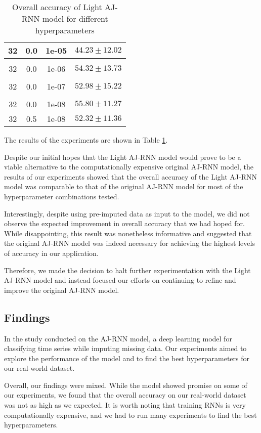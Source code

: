 \begin{table}[!htbp]
\begin{tabular}{cccr}
      32  & 0.0 & 1e-05 & $44.23 \pm 12.02$\\[0.05cm] \hline \\[-0.25cm]
      32  & 0.0 & 1e-06 & $54.32 \pm 13.73$\\[0.05cm] \hline \\[-0.25cm]
      32  & 0.0 & 1e-07 & $52.98 \pm 15.22$\\[0.05cm] \hline \\[-0.25cm]
      32  & 0.0 & 1e-08 & $55.80 \pm 11.27$\\
      32  & 0.5 & 1e-08 & $52.32 \pm 11.36$\\
  \end{tabular}
  \caption{Overall accuracy of Light AJ-RNN model for different hyperparameters}
  \label{tab:LightAJRNNBatchSizeResults}
\end{table}

The results of the experiments are shown in Table \ref{tab:LightAJRNNBatchSizeResults}.

Despite our initial hopes that the Light AJ-RNN model would prove to be a viable alternative to the computationally expensive original AJ-RNN model, the results of our experiments showed that the overall accuracy of the Light AJ-RNN model was comparable to that of the original AJ-RNN model for most of the hyperparameter combinations tested.

Interestingly, despite using pre-imputed data as input to the model, we did not observe the expected improvement in overall accuracy that we had hoped for. 
While disappointing, this result was nonetheless informative and suggested that the original AJ-RNN model was indeed necessary for achieving the highest levels of accuracy in our application.

Therefore, we made the decision to halt further experimentation with the Light AJ-RNN model and instead focused our efforts on continuing to refine and improve the original AJ-RNN model. 


\subsection{Findings}

In the study conducted on the AJ-RNN model, a deep learning model for classifying time series while imputing missing data.
Our experiments aimed to explore the performance of the model and to find the best hyperparameters for our real-world dataset.

Overall, our findings were mixed. 
While the model showed promise on some of our experiments, we found that the overall accuracy on our real-world dataset was not as high as we expected.
It is worth noting that training RNNs is very computationally expensive, and we had to run many experiments to find the best hyperparameters.

